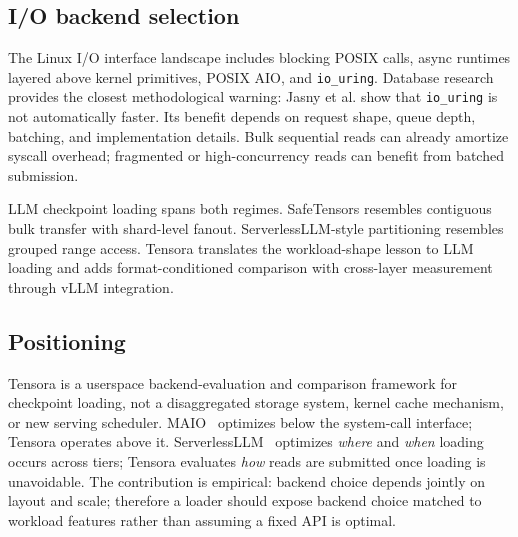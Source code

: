 \subsection{I/O backend selection}

The Linux I/O interface landscape includes blocking POSIX calls, async runtimes layered above kernel primitives, POSIX AIO, and \texttt{io\_uring}. Database research provides the closest methodological warning: Jasny et al. \cite{IOURING_DATABASE_GUIDELINES} show that \texttt{io\_uring} is not automatically faster. Its benefit depends on request shape, queue depth, batching, and implementation details. Bulk sequential reads can already amortize syscall overhead; fragmented or high-concurrency reads can benefit from batched submission.

LLM checkpoint loading spans both regimes. SafeTensors resembles contiguous bulk transfer with shard-level fanout. ServerlessLLM-style partitioning resembles grouped range access. Tensora translates the workload-shape lesson to LLM loading and adds format-conditioned comparison with cross-layer measurement through vLLM integration.

\subsection{Positioning}

Tensora is a userspace backend-evaluation and comparison framework for checkpoint loading, not a disaggregated storage system, kernel cache mechanism, or new serving scheduler. MAIO~\cite{fast26_maio} optimizes below the system-call interface; Tensora operates above it. ServerlessLLM~\cite{FU:2024} optimizes \emph{where} and \emph{when} loading occurs across tiers; Tensora evaluates \emph{how} reads are submitted once loading is unavoidable. The contribution is empirical: backend choice depends jointly on layout and scale; therefore a loader should expose backend choice matched to workload features rather than assuming a fixed API is optimal.

